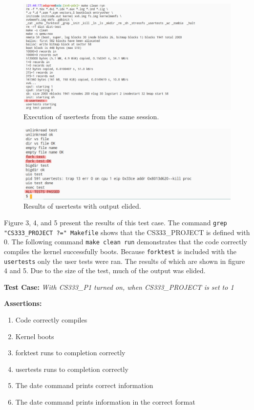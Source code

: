 \documentclass[11pt,letterpaper]{report}
\newcommand{\code}[1]{\colorbox{codegray}{\texttt{#1}}}
\begin{document}
{  \begin{figure}[h!]
	\centering
	\includegraphics[width=1\linewidth]{test3-cont2.png}
	\caption[PRINT\_SYSCALLS=0]{Execution of usertests from the same session.}
	\label{fig:P1compileP0-1}
  \end{figure}

  \begin{figure}[h!]
	\centering
	\includegraphics[width=1\linewidth]{test3-cont.png}
	\caption[PRINT\_SYSCALLS=0]{Results of usertests with output elided.}
	\label{fig:P1compileP0-1}
  \end{figure}
  
  Figure 3, 4, and 5 present the results of this test case. The command \code{grep "CS333\_PROJECT ?=" Makefile}
  shows that the CS333\_PROJECT is defined with 0. The following command \code{make clean run} demonstrates that 
  the code correctly compiles the kernel successfully boots. Because \code{forktest} is included with the \code{usertests}
  only the user tests were ran. The results of which are shown in figure 4 and 5. Due to the size of the test, much of the 
  output was elided. 
  
\pagebreak
  
  \noindent\textbf{Test Case:} \emph{With CS333\_P1 turned on, when CS333\_PROJECT is set to 1}
  
  \noindent\textbf{Assertions:}
  \begin{enumerate}[]
  \item Code correctly compiles
  \item Kernel boots
  \item forktest runs to completion correctly
  \item usertests runs to completion correctly
  \item The date command prints correct information
  \item The date command prints information in the correct format
  \end{enumerate}  
  
}
\end{document}
